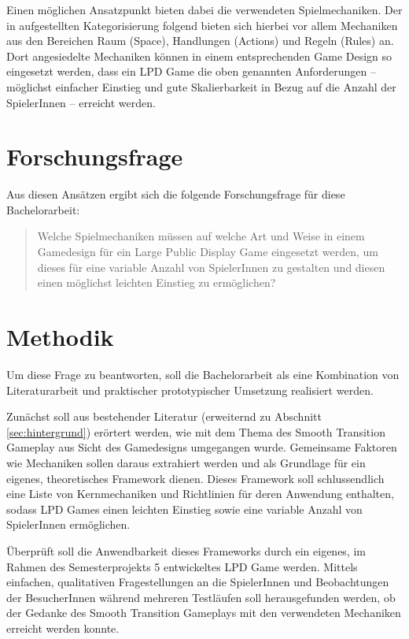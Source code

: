 Einen möglichen Ansatzpunkt bieten dabei die verwendeten Spielmechaniken. Der in \cite{Schell2008} aufgestellten Kategorisierung folgend bieten sich hierbei vor allem Mechaniken aus den Bereichen Raum (Space), Handlungen (Actions) und Regeln (Rules) an. Dort angesiedelte Mechaniken können in einem entsprechenden Game Design so eingesetzt werden, dass ein LPD Game die oben genannten Anforderungen -- möglichst einfacher Einstieg und gute Skalierbarkeit in Bezug auf die Anzahl der SpielerInnen -- erreicht werden.

\section{Forschungsfrage}

Aus diesen Ansätzen ergibt sich die folgende Forschungsfrage für diese Bachelorarbeit:

\begin{quote}
Welche Spielmechaniken müssen auf welche Art und Weise in einem Gamedesign für ein Large Public Display Game eingesetzt werden, um dieses für eine variable Anzahl von SpielerInnen zu gestalten und diesen einen möglichst leichten Einstieg zu ermöglichen?
\end{quote}

\section{Methodik}

Um diese Frage zu beantworten, soll die Bachelorarbeit als eine Kombination von Literaturarbeit und praktischer \bzw prototypischer Umsetzung realisiert werden.

Zunächst soll aus bestehender Literatur (erweiternd zu Abschnitt \ref{sec:hintergrund}) erörtert werden, wie mit dem Thema des Smooth Transition Gameplay aus Sicht des Gamedesigns umgegangen wurde. Gemeinsame Faktoren wie Mechaniken sollen daraus extrahiert werden und als Grundlage für ein eigenes, theoretisches Framework dienen. Dieses Framework soll schlussendlich eine Liste von Kernmechaniken und Richtlinien für deren Anwendung enthalten, sodass LPD Games einen leichten Einstieg sowie eine variable Anzahl von SpielerInnen ermöglichen.

Überprüft soll die Anwendbarkeit dieses Frameworks durch ein eigenes, im Rahmen des Semesterprojekts 5 entwickeltes LPD Game werden. Mittels einfachen, qualitativen Fragestellungen an die SpielerInnen und Beobachtungen der BesucherInnen während mehreren Testläufen soll herausgefunden werden, ob der Gedanke des Smooth Transition Gameplays mit den verwendeten Mechaniken erreicht werden konnte.

